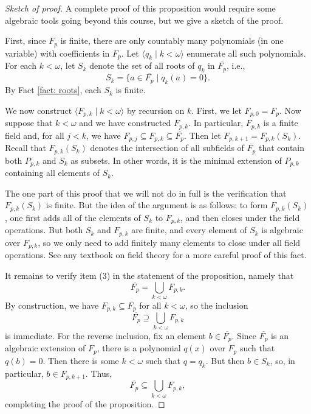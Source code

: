 \documentclass[a4paper]{memoir}
\theoremstyle{definition}
\begin{document}
\begin{proof}[Sketch of proof]
  A complete proof of this proposition would require some algebraic tools going beyond this 
  course, but we give a sketch of the proof.
  
  First, since $F_p$ is finite, there are only countably many polynomials (in one variable) 
  with coefficients in $F_p$. Let $\langle q_k \mid k < \omega \rangle$ enumerate all 
  such polynomials. For each $k < \omega$, let $S_k$ denote the set of all roots of $q_k$ 
  in $\overline{F_p}$, i.e., 
  \[
    S_k = \{a \in \overline{F_p} \mid q_k(a) = 0\}.
  \]
  By Fact \ref{fact: roots}, each $S_k$ is finite.
  
  We now construct $\langle F_{p,k} \mid k < \omega \rangle$ by recursion on $k$. First, 
  we let $F_{p,0} = F_p$. Now suppose that $k < \omega$ and we have constructed 
  $F_{p,k}$. In particular, $F_{p,k}$ is a finite field and, for all $j < k$, we have 
  $F_{p,j} \subseteq F_{p,k} \subseteq \overline{F_p}$. Then let $F_{p,k+1} = F_{p,k}(S_k)$. 
  Recall that $F_{p,k}(S_k)$ denotes the intersection of all subfields of 
  $\overline{F_p}$ that contain both $P_{p,k}$ and $S_k$ as subsets. In other words, it is the 
  minimal extension of $P_{p,k}$ containing all elements of $S_k$.
  
  The one part of this proof that we will not do in full is the verification that $F_{p,k}(S_k)$ 
  is finite. But the idea of the argument is as follows: to form $F_{p,k}(S_k)$, one first 
  adds all of the elements of $S_k$ to $F_{p,k}$, and then closes under the field operations. 
  But both $S_k$ and $F_{p,k}$ are finite, and every element of $S_k$ is algebraic over 
  $F_{p,k}$, so we only need to add finitely many elements to close under all field operations. 
  See any textbook on field theory for a more careful proof of this fact.
  
  It remains to verify item (3) in the statement of the proposition, namely that
  \[
    \overline{F_p} = \bigcup_{k < \omega} F_{p,k}.
  \]
  By construction, we have $F_{p,k} \subseteq \overline{F_p}$ for all $k < \omega$, so the 
  inclusion
  \[
    \overline{F_p} \supseteq \bigcup_{k < \omega} F_{p,k}
  \]
  is immediate. For the reverse inclusion, fix an element $b \in \overline{F_p}$. Since 
  $\overline{F_p}$ is an algebraic extension of $F_p$, there is a polynomial 
  $q(x)$ over $F_p$ such that $q(b) = 0$. Then there is some $k < \omega$ such that 
  $q = q_k$. But then $b \in S_k$, so, in particular, $b \in F_{p,k+1}$. Thus, 
  \[
    \overline{F_p} \subseteq \bigcup_{k < \omega} F_{p,k},
  \]
  completing the proof of the proposition.
\end{proof}
\end{document}
